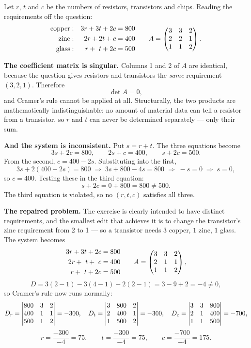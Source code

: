 \begin{solution}
Let $r$, $t$ and $c$ be the numbers of resistors, transistors and chips. Reading
the requirements off the question:
\[
\begin{aligned}
\text{copper}&: & 3r+3t+2c&=800\\
\text{zinc}  &: & 2r+2t+ c&=400\\
\text{glass} &: & \ r+\ t+2c&=500
\end{aligned}
\qquad
A=\begin{pmatrix}3&3&2\\2&2&1\\1&1&2\end{pmatrix}.
\]

\textbf{The coefficient matrix is singular.} Columns 1 and 2 of $A$ are
identical, because the question gives resistors and transistors the
\emph{same} requirement $(3,2,1)$. Therefore
\[
\det A=0,
\]
and Cramer's rule cannot be applied at all. Structurally, the two products are
mathematically indistinguishable: no amount of material data can tell a
resistor from a transistor, so $r$ and $t$ can never be determined separately
--- only their sum.

\medskip
\textbf{And the system is inconsistent.} Put $s=r+t$. The three equations become
\[
3s+2c=800,\qquad 2s+c=400,\qquad s+2c=500 .
\]
From the second, $c=400-2s$. Substituting into the first,
\[
3s+2(400-2s)=800 \;\Longrightarrow\; 3s+800-4s=800
\;\Longrightarrow\; -s=0 \;\Longrightarrow\; s=0,
\]
so $c=400$. Testing these in the third equation:
\[
s+2c=0+800=800 \neq 500 .
\]
The third equation is violated, so no $(r,t,c)$ satisfies all three.


\medskip
\textbf{The repaired problem.} The exercise is clearly intended to have
distinct requirements, and the smallest edit that achieves it is to change the
transistor's zinc requirement from 2 to 1 --- so a transistor needs $3$ copper,
$1$ zinc, $1$ glass. The system becomes
\[
\begin{aligned}
3r+3t+2c&=800\\
2r+\ t+\ c&=400\\
\ r+\ t+2c&=500
\end{aligned}
\qquad
A=\begin{pmatrix}3&3&2\\2&1&1\\1&1&2\end{pmatrix},
\]
\[
D=3(2-1)-3(4-1)+2(2-1)=3-9+2=-4 \neq 0,
\]
so Cramer's rule now runs normally:
\[
D_r=\begin{vmatrix}800&3&2\\400&1&1\\500&1&2\end{vmatrix}=-300,\quad
D_t=\begin{vmatrix}3&800&2\\2&400&1\\1&500&2\end{vmatrix}=-300,\quad
D_c=\begin{vmatrix}3&3&800\\2&1&400\\1&1&500\end{vmatrix}=-700,
\]
\[
r=\frac{-300}{-4}=75,\qquad t=\frac{-300}{-4}=75,\qquad c=\frac{-700}{-4}=175 .
\]


\end{solution}
